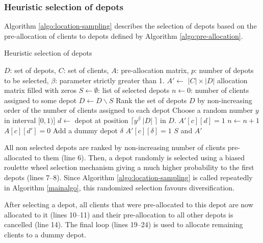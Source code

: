\documentclass[a4paper,10pt]{article}
\begin{document}
\begin{linenumbers}
\newpage

\subsubsection{Heuristic selection of depots}

Algorithm \ref{algo:location-sampling} describes the selection of depots based on the pre-allocation of clients to depots defined by Algorithm \ref{algo:pre-allocation}. 

\begin{algorithm}
	\caption{Heuristic selection of depots}
	\label{algo:location-sampling}
	\begin{algorithmic}[1]
		\REQUIRE $D$: set of depots, $C$: set of clients, $A$: pre-allocation matrix, $p$: number of depots to be selected, $\beta$: parameter strictly greater than 1.
		\STATE  $A' \leftarrow$  $|C| \times |D|$ allocation matrix filled with zeros
		\STATE $S \leftarrow \emptyset$: list of selected depots
		\STATE $n \leftarrow 0$: number of clients assigned to some depot
			\STATE $ D \leftarrow D \backslash S$
			\STATE Rank the set of depots $D$ by non-increasing order of the number of clients assigned to each depot
			\STATE Choose a random number $y$ in interval $[0,1)$]
			\STATE $d \leftarrow$ depot at position $\lceil y^\beta \; |D| \; \rceil$ in $D$.
					\STATE $A'[c][d] = 1$
					\STATE $n \leftarrow n+1$
						\STATE $A[c][d'] = 0$ 
					\ENDFOR
				\ENDIF		
			\ENDFOR
		\ENDWHILE
			\STATE Add a dummy depot $\delta$
				\STATE $A'[c][\delta]=1$
			\ENDFOR
		\ENDIF
		\RETURN $S$ and $A'$
	\end{algorithmic}
\end{algorithm}

All non selected depots are ranked by non-increasing number of clients pre-allocated to them (line 6).
Then, a depot randomly is selected using a biased roulette wheel selection mechanism giving a much higher probability to the first depots (lines 7--8). 
Since Algorithm \ref{algo:location-sampling} is called repeatedly in Algorithm \ref{mainalgo}, this randomized selection favours diversification. 

After selecting a depot, all clients that were pre-allocated to this depot are now allocated to it (lines 10--11) 
and their pre-allocation to all other depots is cancelled (line 14). 
The final loop (lines 19--24) is used to allocate remaining clients to a dummy depot. 


\end{linenumbers}
\end{document}
